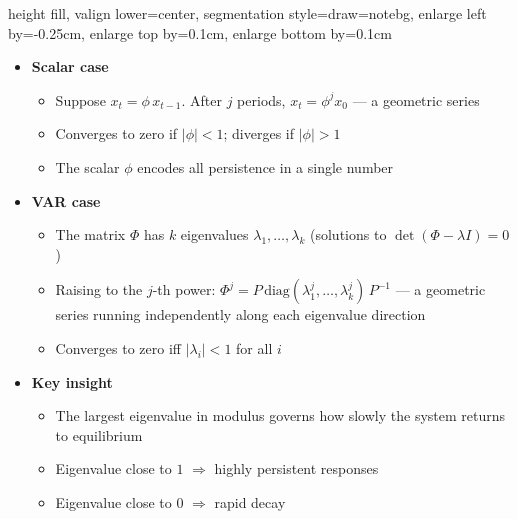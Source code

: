 \documentclass[10pt,handout]{beamer}
\begin{document}
\begin{frame}
\centering
\begin{notebox}{height fill, valign lower=center, segmentation style={draw=notebg}, enlarge left by=-0.25cm, enlarge top by=0.1cm, enlarge bottom by=0.1cm}
\tcblower
\begin{itemize}
\item \textbf{Scalar case} \smallskip
\begin{itemize}
\item Suppose $x_t = \phi\, x_{t-1}$. After $j$ periods, $x_t = \phi^j x_0$ --- a geometric series \smallskip
\item Converges to zero if $|\phi|<1$; diverges if $|\phi|>1$ \smallskip
\item The scalar $\phi$ encodes all persistence in a single number\medskip
\end{itemize}
\item \textbf{VAR case} \smallskip
\begin{itemize}
\item The matrix $\Phi$ has $k$ eigenvalues $\lambda_1,\ldots,\lambda_k$ (solutions to $\det(\Phi - \lambda I)=0$) \smallskip
\item Raising to the $j$-th power: $\Phi^j = P\,\mathrm{diag}(\lambda_1^j,\ldots,\lambda_k^j)\,P^{-1}$ --- a geometric series running independently along each eigenvalue direction \smallskip
\item Converges to zero iff $|\lambda_i|<1$ for all $i$\medskip
\end{itemize}
\item \textbf{Key insight} \smallskip
\begin{itemize}
\item The largest eigenvalue in modulus governs how slowly the system returns to equilibrium \smallskip
\item Eigenvalue close to $1$ $\Rightarrow$ highly persistent responses \smallskip
\item Eigenvalue close to $0$ $\Rightarrow$ rapid decay
\end{itemize}
\end{itemize}
\end{notebox}
\end{frame}
\shownotesblock{}
\end{document}
